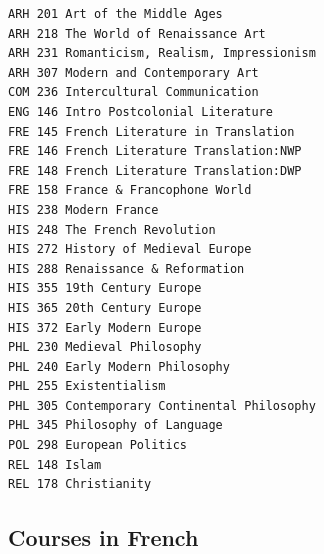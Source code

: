 \documentclass[
  letterpaper,
]{scrbook}
\begin{document}
\begin{verbatim}
ARH 201 Art of the Middle Ages
ARH 218 The World of Renaissance Art
ARH 231 Romanticism, Realism, Impressionism
ARH 307 Modern and Contemporary Art
COM 236 Intercultural Communication
ENG 146 Intro Postcolonial Literature
FRE 145 French Literature in Translation
FRE 146 French Literature Translation:NWP
FRE 148 French Literature Translation:DWP
FRE 158 France & Francophone World
HIS 238 Modern France
HIS 248 The French Revolution
HIS 272 History of Medieval Europe
HIS 288 Renaissance & Reformation
HIS 355 19th Century Europe
HIS 365 20th Century Europe
HIS 372 Early Modern Europe
PHL 230 Medieval Philosophy
PHL 240 Early Modern Philosophy
PHL 255 Existentialism
PHL 305 Contemporary Continental Philosophy
PHL 345 Philosophy of Language
POL 298 European Politics
REL 148 Islam
REL 178 Christianity
\end{verbatim}

\subsection{Courses in French}\label{courses-in-french}
\end{document}
